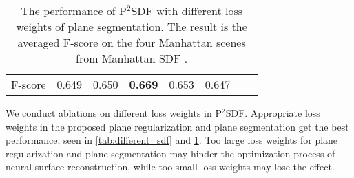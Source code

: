 \documentclass[10pt,journal,compsoc]{IEEEtran}
\begin{document}
\begin{table}[htbp]
	\centering
	\caption{The performance of P$^2$SDF with different loss weights of plane segmentation. The result is the averaged F-score on the four Manhattan scenes from Manhattan-SDF \cite{guo2022neural}.}
	\begin{tabular}{c|ccccccc}
		\toprule
		\makebox[0.2\linewidth][c]{weight} & \makebox[0.02\linewidth][c]{0.001} & \makebox[0.02\linewidth][c]{0.005} & \makebox[0.02\linewidth][c]{0.01} & \makebox[0.02\linewidth][c]{0.05} & \makebox[0.02\linewidth][c]{0.1} \\
		\midrule
		F-score            & 0.649 & 0.650 & \textbf{0.669} & 0.653 & 0.647 \\
		\bottomrule
	\end{tabular}
	\label{tab:different_cross_entropy}
\end{table}
We conduct ablations on different loss weights in P$^2$SDF. Appropriate loss weights in the proposed plane regularization and plane segmentation get the best performance, seen in \cref{tab:different_sdf} and \cref{tab:different_cross_entropy}. Too large loss weights for plane regularization and plane segmentation may hinder the optimization process of neural surface reconstruction, while too small loss weights may lose the effect.
\end{document}
